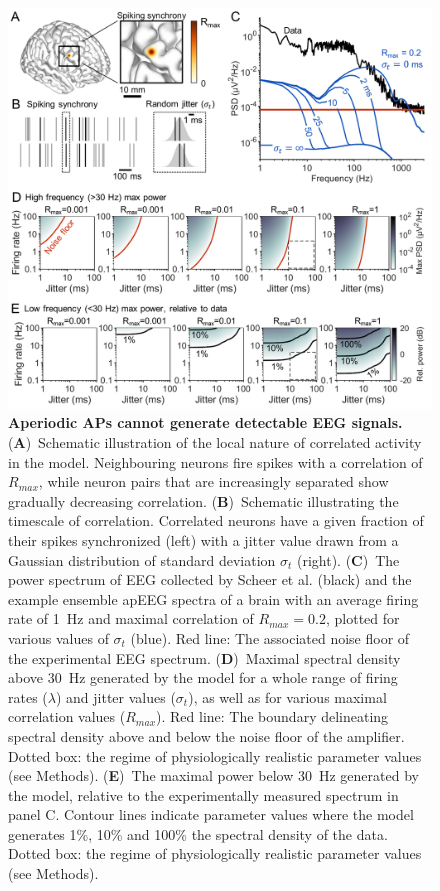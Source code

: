 \begin{figure}[t!]
    \centering
    \includegraphics[width=13.2cm]{Figures/chapter3/figure4.png}
    \caption{\textbf{Aperiodic APs cannot generate detectable EEG signals.} (\textbf{A})~Schematic illustration of the local nature of correlated activity in the model. Neighbouring neurons fire spikes with a correlation of $R_{max}$, while neuron pairs that are increasingly separated show gradually decreasing correlation. (\textbf{B})~Schematic illustrating the timescale of correlation. Correlated neurons have a given fraction of their spikes synchronized (left) with a jitter value drawn from a Gaussian distribution of standard deviation $\sigma_t$ (right). (\textbf{C})~The power spectrum of EEG collected by Scheer et al. \cite{Scheer2006} (black) and the example ensemble apEEG spectra of a brain with an average firing rate of 1~\unit{\hertz} and maximal correlation of $R_{max}=0.2$, plotted for various values of $\sigma_t$ (blue). Red line: The associated noise floor of the experimental EEG spectrum. (\textbf{D})~Maximal spectral density above 30~\unit{\hertz} generated by the model for a whole range of firing rates ($\lambda$) and jitter values ($\sigma_t$), as well as for various maximal correlation values ($R_{max}$). Red line: The boundary delineating spectral density above and below the noise floor of the amplifier. Dotted box: the regime of physiologically realistic parameter values (see Methods). (\textbf{E})~The maximal power below 30~\unit{\hertz} generated by the model, relative to the experimentally measured spectrum in panel C. Contour lines indicate parameter values where the model generates 1\%, 10\% and 100\% the spectral density of the data. Dotted box: the regime of physiologically realistic parameter values (see Methods).}
    \label{fig:apEEG_jitter}
\end{figure}

